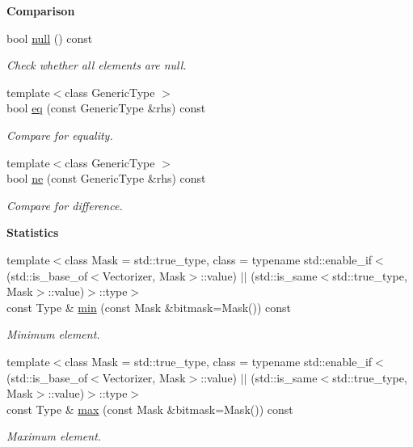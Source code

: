 \begin{Indent}{\bf Comparison}\par
\begin{DoxyCompactItemize}
\item 
bool \hyperlink{classmagrathea_1_1StaticVectorizer_a584d26a12db2398aeb579281f0891397}{null} () const 
\begin{DoxyCompactList}\small\item\em Check whether all elements are null. \end{DoxyCompactList}\item 
{\footnotesize template$<$class Generic\-Type $>$ }\\bool \hyperlink{classmagrathea_1_1StaticVectorizer_a17daca1d726cd6249fcf435c8f36fe6b}{eq} (const Generic\-Type \&rhs) const 
\begin{DoxyCompactList}\small\item\em Compare for equality. \end{DoxyCompactList}\item 
{\footnotesize template$<$class Generic\-Type $>$ }\\bool \hyperlink{classmagrathea_1_1StaticVectorizer_a88432eac2ca07cc75a2c3dd3c068ac0c}{ne} (const Generic\-Type \&rhs) const 
\begin{DoxyCompactList}\small\item\em Compare for difference. \end{DoxyCompactList}\end{DoxyCompactItemize}
\end{Indent}
\begin{Indent}{\bf Statistics}\par
\begin{DoxyCompactItemize}
\item 
{\footnotesize template$<$class Mask  = std\-::true\-\_\-type, class  = typename std\-::enable\-\_\-if$<$(std\-::is\-\_\-base\-\_\-of$<$\-Vectorizer, Mask$>$\-::value) $|$$|$ (std\-::is\-\_\-same$<$std\-::true\-\_\-type, Mask$>$\-::value)$>$\-::type$>$ }\\const Type \& \hyperlink{classmagrathea_1_1StaticVectorizer_a4a0074acfae82d0eec6843eacae83f9b}{min} (const Mask \&bitmask=Mask()) const 
\begin{DoxyCompactList}\small\item\em Minimum element. \end{DoxyCompactList}\item 
{\footnotesize template$<$class Mask  = std\-::true\-\_\-type, class  = typename std\-::enable\-\_\-if$<$(std\-::is\-\_\-base\-\_\-of$<$\-Vectorizer, Mask$>$\-::value) $|$$|$ (std\-::is\-\_\-same$<$std\-::true\-\_\-type, Mask$>$\-::value)$>$\-::type$>$ }\\const Type \& \hyperlink{classmagrathea_1_1StaticVectorizer_a9d815869f22555a895bfb1cb50bfe6da}{max} (const Mask \&bitmask=Mask()) const 
\begin{DoxyCompactList}\small\item\em Maximum element. \end{DoxyCompactList}\end{DoxyCompactItemize}
\end{Indent}

